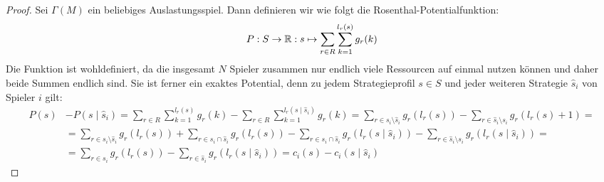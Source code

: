 \begin{proof}
	Sei $\Gamma(M)$ ein beliebiges Auslastungsspiel. Dann definieren wir wie folgt die Rosenthal-Potentialfunktion:
		\[P: S \to \mathbb{R}: s \mapsto \sum_{r \in R}\sum_{k=1}^{l_r(s)} g_r(k) \]
	Die Funktion ist wohldefiniert, da die insgesamt $N$ Spieler zusammen nur endlich viele Ressourcen auf einmal nutzen können und daher beide Summen endlich sind. Sie ist ferner ein exaktes Potential, denn zu jedem Strategieprofil $s \in S$ und jeder weiteren Strategie $\hat{s}_i$ von Spieler $i$ gilt:
	\begin{align*}
		P(s) 	&- P(s\mid \hat{s}_i) = \sum_{r \in R}\sum_{k=1}^{l_r(s)} g_r(k) - \sum_{r \in R}\sum_{k=1}^{l_r(s\mid \hat{s}_i)} g_r(k) = \sum_{r \in s_i \setminus \hat{s}_i} g_r(l_r(s)) - \sum_{r \in \hat{s}_i \setminus s_i} g_r(l_r(s)+1) = \\
				&= \sum_{r \in s_i \setminus \hat{s}_i} g_r(l_r(s)) + \sum_{r \in s_i \cap \hat{s}_i} g_r(l_r(s)) - \sum_{r \in s_i \cap \hat{s}_i} g_r(l_r(s \mid \hat{s}_i)) - \sum_{r \in \hat{s}_i \setminus s_i} g_r(l_r(s\mid \hat{s}_i)) = \\
				&= \sum_{r \in s_i} g_r(l_r(s)) - \sum_{r \in \hat{s}_i} g_r(l_r(s\mid \hat{s}_i)) = c_i(s) - c_i(s \mid \hat{s}_i)
	\end{align*}
	

\end{proof}
